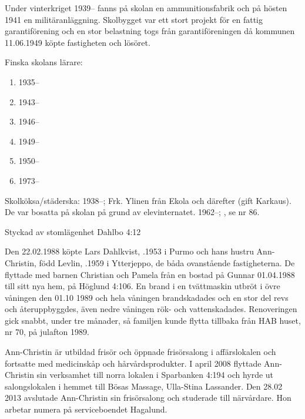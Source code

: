 Under vinterkriget 1939-- fanns på skolan en ammunitionsfabrik och	på hösten 1941 en militäranläggning. Skolbygget var ett stort projekt för en fattig garantiförening och en stor belastning togs från garantiföreningen då kommunen 11.06.1949 köpte	fastigheten och lösöret.

Finska skolans lärare:
\begin{enumerate}
  \item 1935--  
  \item 1943--	
  \item 1946--	
  \item 1949--	
  \item 1950--	
  \item 1973--	
\end{enumerate}

Skolköksa/städerska:
1938--;	Frk. Ylinen från Ekola och därefter  (gift Karkaus). De var bosatta på skolan på grund av elevinternatet.
1962--;	, se nr 86.



%

Styckad av stomlägenhet Dahlbo 4:12


%
Den 22.02.1988 köpte Lars Dahlkvist, .1953 i Purmo och	hans hustru Ann-Christin, född Levlin, .1959 i Ytterjeppo, de båda ovanstående fastigheterna. De flyttade med barnen Christian och Pamela från en bostad på Gunnar 01.04.1988 till sitt nya hem, på Höglund	4:106. En brand i en tvättmaskin utbröt i övre våningen den 01.10 1989 	och hela våningen brandskadades och en stor del revs och 	återuppbyggdes, även nedre våningen rök- och vattenskadades. 	Renoveringen gick snabbt, under tre månader, så familjen kunde flytta tillbaka från HAB huset, nr 70, på	julafton 1989.

Ann-Christin är utbildad frisör och öppnade frisörsalong i affärslokalen och fortsatte med medicinskåp och hårvårdsprodukter. I april 2008 flyttade Ann-Christin sin verksamhet till norra lokalen i Sparbanken 4:194 och hyrde ut	salongslokalen i hemmet till Bösas Massage, Ulla-Stina Lassander. Den 28.02 2013 avslutade Ann-Christin sin frisörsalong och studerade till närvårdare. Hon arbetar numera på serviceboendet Hagalund.

